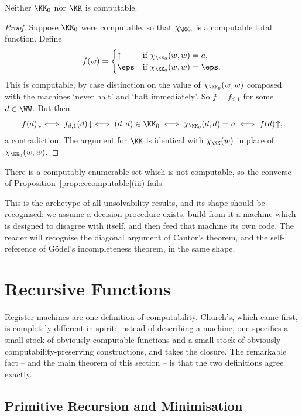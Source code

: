 \begin{theorem}\label{thm:halting}
	Neither $\KK_0$ nor $\KK$ is computable.
\end{theorem}

\begin{proof}
	Suppose $\KK_0$ were computable, so that $\chi_{\KK_0}$ is a computable total function. Define
	$$f(w) = \begin{cases}\uparrow & \text{if } \chi_{\KK_0}(w,w) = a, \\ \eps & \text{if } \chi_{\KK_0}(w,w) = \eps.\end{cases}$$
	This is computable, by case distinction on the value of $\chi_{\KK_0}(w,w)$ composed with the machines `never halt' and `halt immediately'. So $f = f_{d,1}$ for some $d \in \WW$. But then
	$$f(d)\!\downarrow \iff f_{d,1}(d)\!\downarrow \iff (d,d) \in \KK_0 \iff \chi_{\KK_0}(d,d) = a \iff f(d)\!\uparrow,$$
	a contradiction. The argument for $\KK$ is identical with $\chi_{\KK}(w)$ in place of $\chi_{\KK_0}(w,w)$.
\end{proof}

\begin{corollary}
	There is a computably enumerable set which is not computable, so the converse of Proposition~\ref{prop:cecomputable}(iii) fails.
\end{corollary}

This is the archetype of all unsolvability results, and its shape should be recognised: we assume a decision procedure exists, build from it a machine which is designed to disagree with itself, and then feed that machine its own code. The reader will recognise the diagonal argument of Cantor's theorem, and the self-reference of G\"odel's incompleteness theorem, in the same shape.

\section{Recursive Functions}\label{sec:recursive}

Register machines are one definition of computability. Church's, which came first, is completely different in spirit: instead of describing a machine, one specifies a small stock of obviously computable functions and a small stock of obviously computability-preserving constructions, and takes the closure. The remarkable fact -- and the main theorem of this section -- is that the two definitions agree exactly.

\subsection{Primitive Recursion and Minimisation}

